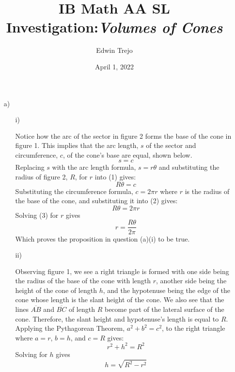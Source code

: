 \documentclass{article}
\title{IB Math AA SL Investigation:\emph{Volumes of Cones}}
\author{Edwin Trejo}
\date{April 1, 2022}
\begin{document}
\maketitle

\begin{itemize}
    \item[a)]
    \begin{itemize}
        \item[i)] 
        
        Notice how the arc of the sector in figure 2 forms the base of the cone in figure 1. This implies that the arc length, \(s\) of the sector and circumference, \(c\), of the cone's base are equal, shown below. 
        \begin{equation} \label{eq1}
            s=c
        \end{equation}
        Replacing \(s\) with the arc length formula, \(s=r\theta\) and substituting the radius of figure 2, \(R\), for \(r\) into (1) gives:
        \begin{equation} \label{eq2}
            R\theta = c
        \end{equation}
        Substituting the circumference formula, \(c=2\pi r\) where \(r\) is the radius of the base of the cone, and substituting it into (2) gives:
        \begin{equation} \label{eq3}
            R\theta = 2\pi r
        \end{equation}
        Solving (3) for \(r\) gives 
        \begin{equation} \label{eq4}
            r=\frac{R\theta}{2\pi}
        \end{equation}
        Which proves the proposition in question (a)(i) to be true.
        
        \item[ii)]
        
        Observing figure 1, we see a right triangle is formed with one side being the radius of the base of the cone with length \(r\), another side being the height of the cone of length \(h\), and the hypotenuse being the edge of the cone whose length is the slant height of the cone. 
        \newline
        We also see that the lines \(\overline{AB}\) and \(\overline{BC}\) of length \(R\) become part of the lateral surface of the cone. Therefore, the slant height and hypotenuse's length is equal to \(R\). Applying the Pythagorean Theorem, \(a^2+b^2=c^2\), to the right triangle where \(a=r\), \(b=h\), and \(c=R\) gives: 
        \begin{equation}
            r^2+h^2=R^2
        \end{equation}
        Solving for \(h\) gives 
        \begin{equation}
            h=\sqrt{R^2-r^2}
        \end{equation}
        

\end{itemize}
\end{itemize}
\end{document}
